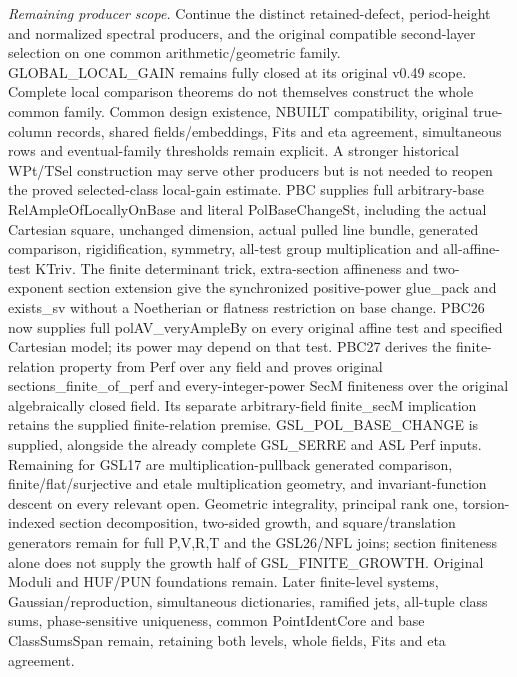 \emph{Remaining producer scope.} Continue the distinct retained-defect, period-height and normalized spectral producers, and the original compatible second-layer selection on one common arithmetic/geometric family. GLOBAL\_\allowbreak LOCAL\_\allowbreak GAIN remains fully closed at its original v0.49 scope. Complete local comparison theorems do not themselves construct the whole common family. Common design existence, NBUILT compatibility, original true-column records, shared fields/embeddings, Fits and eta agreement, simultaneous rows and eventual-family thresholds remain explicit. A stronger historical WPt/TSel construction may serve other producers but is not needed to reopen the proved selected-class local-gain estimate. PBC supplies full arbitrary-base RelAmpleOfLocallyOnBase and literal PolBaseChangeSt, including the actual Cartesian square, unchanged dimension, actual pulled line bundle, generated comparison, rigidification, symmetry, all-test group multiplication and all-affine-test KTriv. The finite determinant trick, extra-section affineness and two-exponent section extension give the synchronized positive-power glue\_\allowbreak pack and exists\_\allowbreak sv without a Noetherian or flatness restriction on base change. PBC26 now supplies full polAV\_\allowbreak veryAmpleBy on every original affine test and specified Cartesian model; its power may depend on that test. PBC27 derives the finite-relation property from Perf over any field and proves original sections\_\allowbreak finite\_\allowbreak of\_\allowbreak perf and every-integer-power SecM finiteness over the original algebraically closed field. Its separate arbitrary-field finite\_\allowbreak secM implication retains the supplied finite-relation premise. GSL\_\allowbreak POL\_\allowbreak BASE\_\allowbreak CHANGE is supplied, alongside the already complete GSL\_\allowbreak SERRE and ASL Perf inputs. Remaining for GSL17 are multiplication-pullback generated comparison, finite/flat/surjective and etale multiplication geometry, and invariant-function descent on every relevant open. Geometric integrality, principal rank one, torsion-indexed section decomposition, two-sided growth, and square/translation generators remain for full P,V,R,T and the GSL26/NFL joins; section finiteness alone does not supply the growth half of GSL\_\allowbreak FINITE\_\allowbreak GROWTH. Original Moduli and HUF/PUN foundations remain. Later finite-level systems, Gaussian/reproduction, simultaneous dictionaries, ramified jets, all-tuple class sums, phase-sensitive uniqueness, common PointIdentCore and base ClassSumsSpan remain, retaining both levels, whole fields, Fits and eta agreement.



